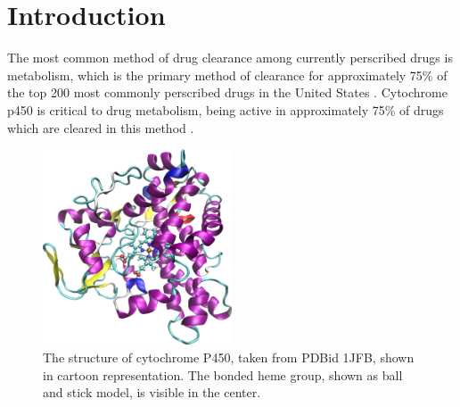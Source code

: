 \section{Introduction}
\label{section:p450/introduction}
The most common method of drug clearance among currently perscribed drugs is metabolism, which is the primary method of clearance for approximately 75\% of the top 200 most commonly perscribed drugs in the United States \cite{williams2004drug}.
Cytochrome p450 is critical to drug metabolism, being active in approximately 75\% of drugs which are cleared in this method \cite{guengerich2007cytochrome}.

\begin{figure}[h]
    \centering
    \includegraphics[width=0.5\textwidth]{figures/p450.png}
    \caption{
The structure of cytochrome P450, taken from PDBid 1JFB, shown in cartoon representation.
The bonded heme group, shown as ball and stick model, is visible in the center.
        }
    \label{fig:funnel}
\end{figure}

